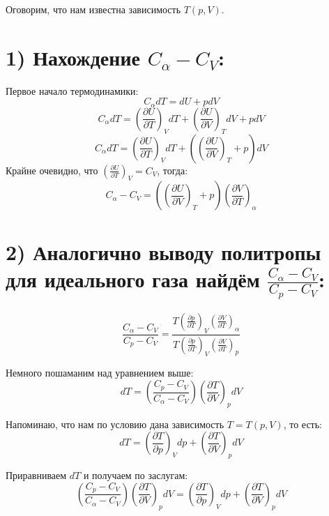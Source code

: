 \documentclass[a4paper,12pt]{article}
\begin{document}
    \newpage
    \begin{spacing}{1.8}
    \end{spacing}
    
    \large{Оговорим, что нам известна зависимость $T(p, V)$.}
    \section*{1) Нахождение $C_{\alpha} - C_{V}$:}

    Первое начало термодинамики:
    \[ C_{\alpha}dT = dU + pdV \]
    \[ C_{\alpha}dT = \left(\frac{\partial U}{\partial T} \right)_{V}dT  + \left(\frac{\partial U}{\partial V} \right)_{T}dV  + pdV\]
    \[ C_{\alpha}dT = \left(\frac{\partial U}{\partial T} \right)_{V}dT + \left(\left(\frac{\partial U }{\partial V}\right)_{T} + p\right)dV \]
    Крайне очевидно, что $\left(\frac{\partial U}{\partial T}\right)_{V} = C_{V}$, тогда: 
    \[ C_{\alpha} - C_{V} = \left(\left(\frac{\partial U }{\partial V}\right)_{T} + p\right)\left(\frac{\partial V}{\partial T}\right)_{\alpha}\]

    \section*{2) Аналогично выводу политропы для идеального газа 
    найдём $\frac{C_{\alpha} - C_{V}}{C_{p} - C_{V}}$:}
    \[ \frac{C_{\alpha} - C_{V}}{C_{p} - C_{V}} = \frac{T\left(\frac{\partial p}{\partial T}\right)_{V}\left(\frac{\partial V}{\partial T}\right)_{\alpha}}{T\left(\frac{\partial p}{\partial T}\right)_{V}\left(\frac{\partial V}{\partial T}\right)_{p}} \]

    Немного пошаманим над уравнением выше:
    \[ dT = \left(\frac{C_{p} - C_{V}}{C_{\alpha} - C_{V}}\right)\left(\frac{\partial T}{\partial V}\right)_{p}dV \]

    Напоминаю, что нам по условию дана зависимость $T = T(p, V)$, то есть:
    \[ dT = \left(\frac{\partial T}{\partial p}\right)_{V}dp + \left(\frac{\partial T}{\partial V}\right)_{p}dV \]
    
    \newpage

    Приравниваем $dT$ и получаем по заслугам:
    \[ \left(\frac{C_{p} - C_{V}}{C_{\alpha} - C_{V}}\right)\left(\frac{\partial T}{\partial V}\right)_{p}dV = \left(\frac{\partial T}{\partial p}\right)_{V}dp + \left(\frac{\partial T}{\partial V}\right)_{p}dV \]
\end{document}
